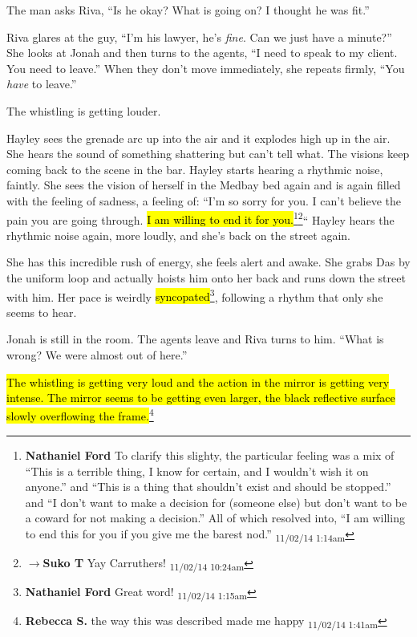 The man asks Riva, ``Is he okay?  What is going on?  I thought he was fit.''

Riva glares at the guy, ``I'm his lawyer, he's \textit{fine}.  Can we just have a minute?''  She looks at Jonah and then turns to the agents, ``I need to speak to my client.  You need to leave.''  When they don't move immediately, she repeats firmly, ``You \textit{have }to leave.''

The whistling is getting louder.



Hayley sees the grenade arc up into the air and it explodes high up in the air.  She hears the sound of something shattering but can't tell what.  The visions keep coming back to the scene in the bar.  Hayley starts hearing a rhythmic noise, faintly.  She sees the vision of herself in the Medbay bed again and is again filled with the feeling of sadness, a feeling of: ``I'm so sorry for you. I can't believe the pain you are going through. \hl{I am willing to end it for you.}\footnote{\textbf{Nathaniel Ford }To clarify this slighty, the particular feeling was a mix of ``This is a terrible thing, I know for certain, and I wouldn't wish it on anyone.'' and ``This is a thing that shouldn't exist and should be stopped.'' and ``I don't want to make a decision for (someone else) but don't want to be a coward for not making a decision.'' All of which resolved into, ``I am willing to end this for you if you give me the barest nod.'' \textsubscript{11/02/14 1:14am}}\footnote{$\rightarrow$\textbf{Suko T }Yay Carruthers! \textsubscript{11/02/14 10:24am}}``  Hayley hears the rhythmic noise again, more loudly, and she's back on the street again.

She has this incredible rush of energy, she feels alert and awake.  She grabs Das by the uniform loop and actually hoists him onto her back and runs down the street with him.  Her pace is weirdly \hl{syncopated}\footnote{\textbf{Nathaniel Ford }Great word! \textsubscript{11/02/14 1:15am}}, following a rhythm that only she seems to hear.



Jonah is still in the room.  The agents leave and Riva turns to him.  ``What is wrong?  We were almost out of here.''

\hl{The whistling is getting very loud and the action in the mirror is getting very intense.  The mirror seems to be getting even larger, the black reflective surface slowly overflowing the frame.}\footnote{\textbf{Rebecca S. }the way this was described made me happy \textsubscript{11/02/14 1:41am}}

